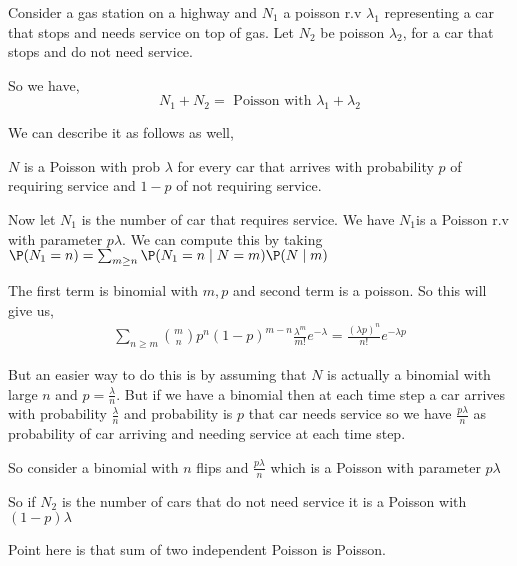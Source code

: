 \begin{eg}
	Consider a gas station on a highway and $N_{1}$ a poisson r.v  $\lambda_{1}$ representing a car that stops and needs service on top of gas. Let $N_{2}$ be poisson $\lambda_{2}$, for a car that stops and do not need service.

	So we have, 
	$$
	N_{1} + N_{2} = \text{ Poisson  with  $\lambda_{1}+ \lambda_{2}$}
	$$

	We can describe it as follows as well,
	\vspace{1em}
	

	$N$ is a Poisson with prob $\lambda$ for every car that arrives with probability $p$ of requiring service and $1 - p$ of not requiring service.

	\vspace{1em}
	
	Now let $N_{1}$ is the number of car that requires service. We have $N_{1}$is a Poisson r.v with parameter $p \lambda$. We can compute this by taking $\P(N_{1} = n) = \sum_{m \ge n} \P(N_{1} = n \mid N = m) \P(N \mid m)$ 

	The first term is binomial with $m, p$ and second term is a poisson. So this will give us,
	\begin{align*}
		\sum_{n \ge m} {m \choose n} p^{n} (1 - p)^{m - n} \frac{\lambda^{m}}{m!} e^{ - \lambda}= 
		\frac{(\lambda p)^{n}}{n!} e^{- \lambda p}
	\end{align*}

	But an easier way to do this is by assuming that $N$ is actually a binomial with large $n$ and $p = \frac{\lambda}{n}$. But if we have a binomial then at each time step a car arrives with probability $\frac{\lambda}{n}$ and probability is $p$ that car needs service so we have $\frac{p\lambda}{n}$ as probability of car arriving and needing service at each time step.

	\vspace{1em}
	
	So consider a binomial with $n$ flips and $\frac{p \lambda}{n}$ which is a Poisson with parameter $p \lambda$

	\vspace{1em}
	
	So if $N_{2}$ is the number of cars that do not need service it is a Poisson with $(1 - p) \lambda$
\end{eg}

\begin{remark}
	Point here is that sum of two independent Poisson is Poisson.
\end{remark}
